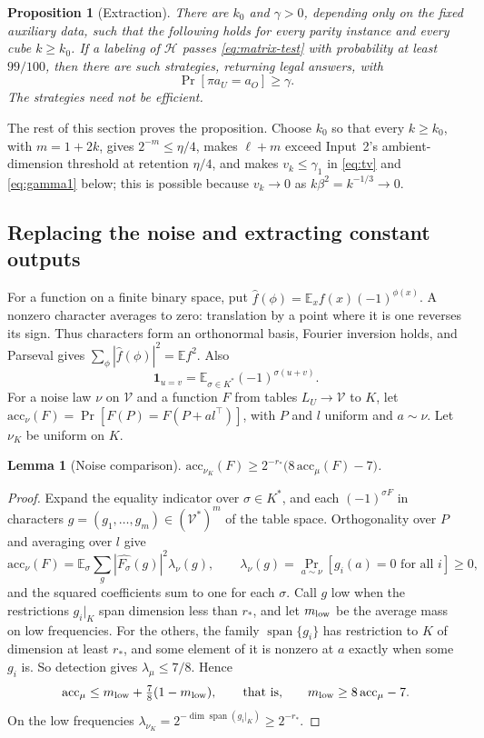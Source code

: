 \documentclass[11pt]{article}
\newtheorem{proposition}[theorem]{Proposition}
\newtheorem{lemma}[theorem]{Lemma}
\newcommand{\E}{\mathbb E}
\newcommand{\Span}{\operatorname{span}}
\newcommand{\ind}{\mathbf 1}
\begin{document}
\begin{proposition}[Extraction]\label{prop:extraction}
There are $k_0$ and $\gamma>0$, depending only on the fixed auxiliary data,
such that the following holds for every parity instance and every cube
$k\ge k_0$. If a labeling of $\mathcal H$ passes \eqref{eq:matrix-test} with
probability at least $99/100$, then there are such strategies, returning
legal answers, with
\begin{equation}\label{eq:agreement}
 \Pr[\pi a_U=a_O]\ge\gamma.
\end{equation}
The strategies need not be efficient.
\end{proposition}

\noindent The rest of this section proves the proposition. Choose $k_0$
so that every $k\ge k_0$, with $m=1+2k$, gives $2^{-m}\le\eta/4$, makes
$\ell+m$ exceed Input~2's ambient-dimension threshold at retention
$\eta/4$, and makes $v_k\le\gamma_1$ in \eqref{eq:tv} and
\eqref{eq:gamma1} below; this is possible because $v_k\to0$ as
$k\beta^2=k^{-1/3}\to0$.

\subsection{Replacing the noise and extracting constant outputs}

For a function on a finite binary space, put
$\widehat f(\phi)=\E_x f(x)(-1)^{\phi(x)}$.
A nonzero character averages to zero: translation by a point where it is
one reverses its sign. Thus characters form an orthonormal basis, Fourier
inversion holds, and Parseval gives
$\sum_\phi|\widehat f(\phi)|^2=\E f^2$. Also
\[
 \ind_{u=v}=\E_{\sigma\in K^*}(-1)^{\sigma(u+v)}.
\]
For a noise law $\nu$ on $\mathcal V$ and a function $F$ from tables
$L_U\to\mathcal V$ to $K$, let $\mathrm{acc}_\nu(F)=\Pr[F(P)=F(P+al^\top)]$,
with $P$ and $l$ uniform and $a\sim\nu$. Let $\nu_K$ be uniform on $K$.

\begin{lemma}[Noise comparison]\label{lem:noise-comparison}
$\mathrm{acc}_{\nu_K}(F)\ge2^{-r_*}\bigl(8\,\mathrm{acc}_\mu(F)-7\bigr)$.
\end{lemma}

\begin{proof}
Expand the equality indicator over $\sigma\in K^*$, and each
$(-1)^{\sigma F}$ in characters $g=(g_1,\ldots,g_m)\in(\mathcal V^*)^m$ of
the table space. Orthogonality over $P$ and averaging over $l$ give
\[
 \mathrm{acc}_\nu(F)=\E_\sigma\sum_g|\widehat{F_\sigma}(g)|^2\lambda_\nu(g),
 \qquad
 \lambda_\nu(g)=\Pr_{a\sim\nu}[g_i(a)=0\text{ for all }i]\ge0,
\]
and the squared coefficients sum to one for each $\sigma$. Call $g$ low when
the restrictions $g_i|_K$ span dimension less than $r_*$, and let
$m_{\rm low}$ be the average mass on low frequencies. For the others, the family
$\Span\{g_i\}$ has restriction to $K$ of dimension at least $r_*$, and
some element of it is nonzero at $a$ exactly when some $g_i$ is. So detection gives
$\lambda_\mu\le7/8$. Hence
\[
 \mathrm{acc}_\mu\le m_{\rm low}+\tfrac78(1-m_{\rm low}),\qquad\text{that is,}\qquad
 m_{\rm low}\ge8\,\mathrm{acc}_\mu-7.
\]
On the low frequencies
$\lambda_{\nu_K}=2^{-\dim\Span(g_i|_K)}\ge2^{-r_*}$.
\end{proof}
\end{document}
